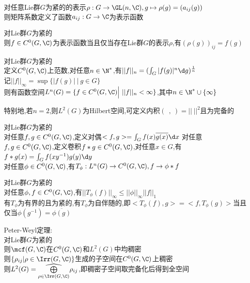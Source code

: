 \begin{zhu}
对任意Lie群$G$为紧的的表示$\rho:G\to \GL(n,\C),g\mapsto \rho(g)=(a_{ij}(g))$\\
则矩阵系数定义了函数$a_{ij}:G\to \C$为表示函数
\end{zhu}

\begin{dingli}
对Lie群$G$为紧的\\
则$f\in C^{0}(G,\C)$为表示函数当且仅当存在Lie群$G$的表示$\rho$,有$(\rho(g))_{ij}=f(g)$
\end{dingli}

\begin{dingyi}
对Lie群$G$为紧的\\
定义$C^{0}(G,\C)$上范数,对任意$n\in \N^{*}$,有$||f||_{n}=(\int_{G}|f(g)|^{n}\d g)^{\frac{1}{n}}$\\
记$||f||_{\infty}=\sup\{|f(g)|\ \Big|\ g\in G\}$\\
则有函数空间$L^{n}(G)=\{f\in C^{0}(G,\C)\Big|\ ||f||_{n}<\infty\}$,其中$n\in\N^{*}\cup\{\infty\}$
\end{dingyi}

\begin{zhu}
特别地,若$n=2$,则$L^{2}(G)$为Hilbert空间,可定义内积$(\ \ ,\ )=||\ ||^2$且为完备的
\end{zhu}

\begin{dingyi}
对Lie群$G$为紧的\\
对任意$f,g\in C^{0}(G,\C)$,定义对偶$<f,g>=\int_{G}f(x)\overline{g(x)}\d x$
对任意$f,g\in C^{0}(G,\C)$,定义卷积$f*g\in C^{0}(G,\C)$,对任意$x\in G$,有$f*g(x)=\int_{G}f(xy^{-1})g(y)\d y$\\
对任意$\phi\in C^{0}(G,\C)$,有$T_{\phi}:L^{n}(G)\to C^{0}(G,\C),f\to \phi*f$
\end{dingyi}

\begin{dingli}
对Lie群$G$为紧的\\
对任意$\phi,f\in C^{0}(G,\C)$,有$||T_{\phi}(f)||_{\infty}\leq ||\phi||_{\infty}||f||_{1}$\\
有$T_{\phi}$为有界的且为紧的,有$T_{\phi}$为自伴随的,即$<T_{\phi}(f),g>=<f,T_{\phi}(g)>$当且仅当$\phi(g^{-1})=\overline{\phi(g)}$
\end{dingli}

\begin{dingli}
Peter-Weyl定理:\\
对Lie群$G$为紧的\\
则$\mcf(G,\C)$在$C^{0}(G,\C)$和$L^{2}(G)$中均稠密\\
则$\{\rho_{ij}|\rho\in \Irr(G,\C)\}$生成的子空间在$C^{0}(G,\C)$上稠密\\
则$L^{2}(G)=\widehat{\bigoplus\limits_{\rho\in \Irr(G,\C)}}\rho_{ij}$,即稠密子空间取完备化后得到全空间
\end{dingli}


